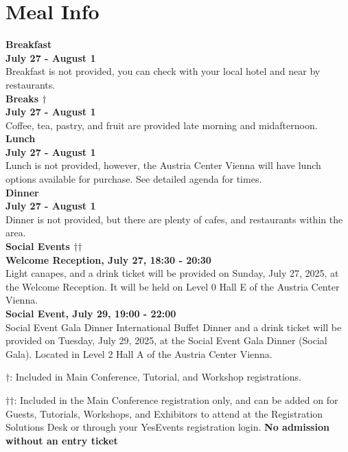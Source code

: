 \chapter{Meal Info}
\vspace*{0.2cm}

\textbf{Breakfast}\\

\textbf{July 27 - August 1}\\
Breakfast is not provided, you can check with your local hotel and near by restaurants.\\

\textbf{Breaks $\dagger$}\\

\textbf{July 27 - August 1}\\
Coffee, tea, pastry, and fruit are provided late morning and midafternoon.\\

\textbf{Lunch}\\

\textbf{July 27 - August 1}\\
Lunch is not provided, however, the Austria Center Vienna will have lunch options available for purchase. See detailed agenda for times. \\

\textbf{Dinner}\\

\textbf{July 27 - August 1}\\

Dinner is  not provided, but there are plenty of cafes, and restaurants within the area.\\

\textbf{Social Events $\dagger$$\dagger$} \\
\textbf{Welcome Reception, July 27, 18:30 - 20:30}\\

Light canapes, and a drink ticket will be provided on Sunday, July 27, 2025, at the Welcome Reception. It will be held on Level 0 Hall E of the Austria Center Vienna.\\

\textbf{Social Event, July 29, 19:00 - 22:00}\\

Social Event Gala Dinner International Buffet Dinner and a drink ticket will be provided on Tuesday, July 29, 2025, at the Social Event Gala Dinner (Social Gala). Located in Level 2 Hall A of the Austria Center Vienna.\\

\vspace{4em}

$\dagger$: Included in Main Conference, Tutorial, and Workshop registrations.

$\dagger$$\dagger$: Included in the Main Conference registration only, and can be added on for Guests, Tutorials, Workshops, and Exhibitors to attend at the Registration Solutions Desk or through your YesEvents registration login. \textbf{No admission without an entry ticket}

